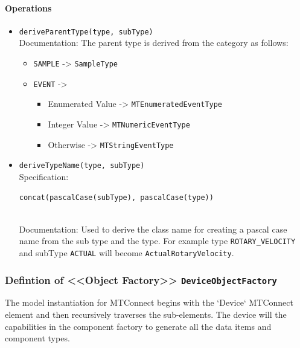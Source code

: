 \paragraph{Operations}
\begin{itemize}
  \item \texttt{deriveParentType(type, subType)}\\
    Documentation: The parent type is derived from the category as follows: 

\begin{itemize}
  \item \texttt{SAMPLE} -> \texttt{SampleType}
  \item \texttt{EVENT} ->
  \begin{itemize}
   \item Enumerated Value -> \texttt{MTEnumeratedEventType}
   \item Integer Value -> \texttt{MTNumericEventType}
   \item Otherwise -> \texttt{MTStringEventType}
  \end{itemize}
\end{itemize}

  \item \texttt{deriveTypeName(type, subType)}\\
    Specification:
   \indent \begin{Verbatim}[xleftmargin=.25in,fontsize=\small]
concat(pascalCase(subType), pascalCase(type))
\end{Verbatim}
\\
    Documentation: Used to derive the class name for creating a pascal case name from the sub type and the type. 
For example type \texttt{ROTARY_VELOCITY} and subType \texttt{ACTUAL} will become \texttt{ActualRotaryVelocity}.

\end{itemize}
\subsubsection{Defintion of <<Object Factory>> \texttt{DeviceObjectFactory}} \label{type:DeviceObjectFactory}

\FloatBarrier

The model instantiation for MTConnect begins with the `Device` MTConnect element and then recursively traverses the sub-elements. The device will the capabilities in the component factory to generate all the data items and component types. 


